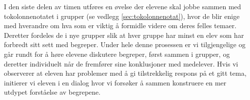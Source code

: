 \documentclass[main.tex]{subfiles}
\begin{document}
I den siste delen av timen utføres en øvelse der elevene skal jobbe sammen med tokolonnenotatet i 
grupper (se vedlegg \ref{sec:tokolonnenotat}), hvor de blir enige med hverandre om hva som er viktig 
å formidle videre om deres felles temaer. Deretter fordeles de i nye grupper slik at hver gruppe har 
minst en elev som har forbredt sitt sett med begreper. Under hele denne prosessen er vi 
tilgjengelige og går rundt for å høre elevene diskutere begreper, først sammen i grupper, og 
deretter individuelt når de fremfører sine konklusjoner med medelever. Hvis vi observerer at eleven 
har problemer med å gi tilstrekkelig respons på et gitt tema, initierer vi eleven i en dialog hvor 
vi forsøker å sammen konstruere en mer utdypet forståelse av begrepene. 


\end{document}
